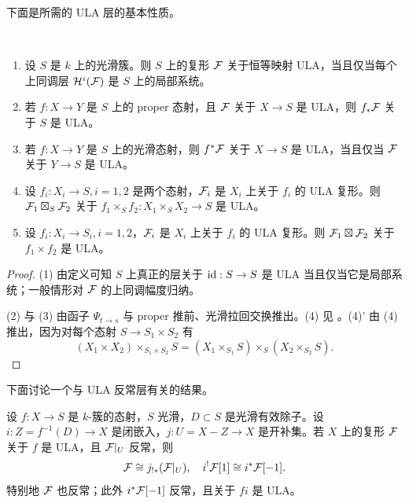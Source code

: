 下面是所需的 ULA 层的基本性质。

\begin{thm}\label{ULA prop}~
\begin{enumerate}
\item 设 $S$ 是 $k$ 上的光滑簇。则 $S$ 上的复形 ${\mathcal F}$ 关于恒等映射 ULA，当且仅当每个上同调层 ${\mathcal H}^i({\mathcal F})$ 是 $S$ 上的局部系统。

\item 若 $f:X\to Y$ 是 $S$ 上的 proper 态射，且 ${\mathcal F}$ 关于 $X\to S$ 是 ULA，则 $f_*{\mathcal F}$ 关于 $S$ 是 ULA。

\item 若 $f:X\to Y$ 是 $S$ 上的光滑态射，则 $f^*{\mathcal F}$ 关于 $X\to S$ 是 ULA，当且仅当 ${\mathcal F}$ 关于 $Y\to S$ 是 ULA。

\item 设 $f_i:X_i\to S, i=1,2$ 是两个态射，${\mathcal F}_i$ 是 $X_i$ 上关于 $f_i$ 的 ULA 复形。则 ${\mathcal F}_1\boxtimes_S{\mathcal F}_2$ 关于 $f_1\times_Sf_2:X_1\times_SX_2\to S$ 是 ULA。

\item[(4)'] 设 $f_i:X_i\to S_i, i=1,2$，${\mathcal F}_i$ 是 $X_i$ 上关于 $f_i$ 的 ULA 复形。则 ${\mathcal F}_1\boxtimes{\mathcal F}_2$ 关于 $f_1\times f_2$ 是 ULA。
\end{enumerate}
\end{thm}

\begin{proof}
(1) 由定义可知 $S$ 上真正的层关于 ${\operatorname{id}}:S\to S$ 是 ULA 当且仅当它是局部系统；一般情形对 ${\mathcal F}$ 的上同调幅度归纳。

(2) 与 (3) 由函子 $\Psi_{t\to s}$ 与 proper 推前、光滑拉回交换推出。(4) 见 \cite[Corollary 2.5]{Il3}。(4)' 由 (4) 推出，因为对每个态射 $S\to S_1\times S_2$ 有
\[(X_1\times X_2)\times_{S_1\times S_2}S=(X_1\times_{S_1}S)\times_S(X_2\times_{S_2}S).\]
\end{proof}

下面讨论一个与 ULA 反常层有关的结果。

\begin{thm}\label{ULA perverse}
设 $f: X\to S$ 是 $k$-簇的态射，$S$ 光滑，$D\subset S$ 是光滑有效除子。设 $i: Z=f^{-1}(D)\to X$ 是闭嵌入，$j:U=X-Z\to X$ 是开补集。若 $X$ 上的复形 ${\mathcal F}$ 关于 $f$ 是 ULA，且 ${\mathcal F}|_U$ 反常，则
\[{\mathcal F}\cong j_{!*}({\mathcal F}|_U), \quad i^!{\mathcal F}[1]\cong i^*{\mathcal F}[-1].\]
特别地 ${\mathcal F}$ 也反常；此外 $i^*{\mathcal F}[-1]$ 反常，且关于 $fi$ 是 ULA。
\end{thm}


